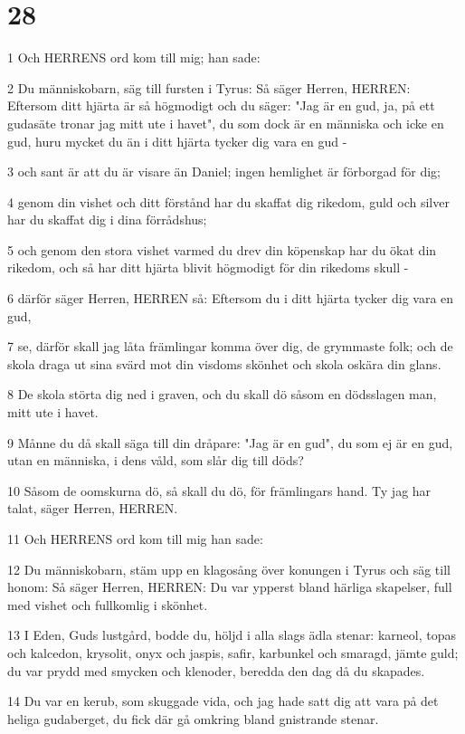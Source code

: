\chapter{28}

\par 1 Och HERRENS ord kom till mig; han sade:
\par 2 Du människobarn, säg till fursten i Tyrus: Så säger Herren, HERREN: Eftersom ditt hjärta är så högmodigt och du säger: "Jag är en gud, ja, på ett gudasäte tronar jag mitt ute i havet", du som dock är en människa och icke en gud, huru mycket du än i ditt hjärta tycker dig vara en gud -
\par 3 och sant är att du är visare än Daniel; ingen hemlighet är förborgad för dig;
\par 4 genom din vishet och ditt förstånd har du skaffat dig rikedom, guld och silver har du skaffat dig i dina förrådshus;
\par 5 och genom den stora vishet varmed du drev din köpenskap har du ökat din rikedom, och så har ditt hjärta blivit högmodigt för din rikedoms skull -
\par 6 därför säger Herren, HERREN så: Eftersom du i ditt hjärta tycker dig vara en gud,
\par 7 se, därför skall jag låta främlingar komma över dig, de grymmaste folk; och de skola draga ut sina svärd mot din visdoms skönhet och skola oskära din glans.
\par 8 De skola störta dig ned i graven, och du skall dö såsom en dödsslagen man, mitt ute i havet.
\par 9 Månne du då skall säga till din dråpare: "Jag är en gud", du som ej är en gud, utan en människa, i dens våld, som slår dig till döds?
\par 10 Såsom de oomskurna dö, så skall du dö, för främlingars hand. Ty jag har talat, säger Herren, HERREN.
\par 11 Och HERRENS ord kom till mig han sade:
\par 12 Du människobarn, stäm upp en klagosång över konungen i Tyrus och säg till honom: Så säger Herren, HERREN: Du var ypperst bland härliga skapelser, full med vishet och fullkomlig i skönhet.
\par 13 I Eden, Guds lustgård, bodde du, höljd i alla slags ädla stenar: karneol, topas och kalcedon, krysolit, onyx och jaspis, safir, karbunkel och smaragd, jämte guld; du var prydd med smycken och klenoder, beredda den dag då du skapades.
\par 14 Du var en kerub, som skuggade vida, och jag hade satt dig att vara på det heliga gudaberget, du fick där gå omkring bland gnistrande stenar.
